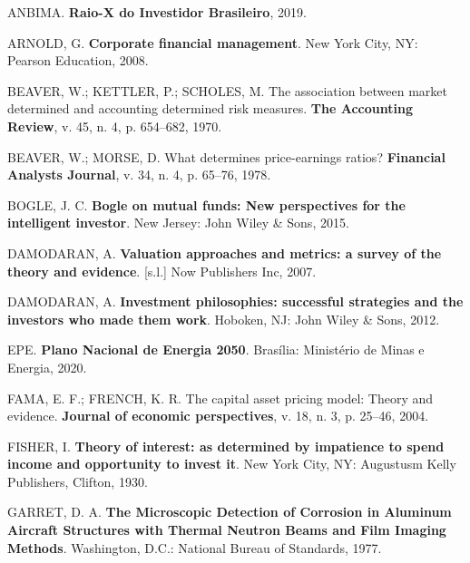 \documentclass[grad,numbers]{coppe}
\newenvironment{cslreferences}%
  {}%
  {\par}
\begin{document}

  \label{bib:begin}
  \noindent

  \setlength{\parindent}{-0.20in}
  \setlength{\leftskip}{0.20in}
  \setlength{\parskip}{8pt}

  \hypertarget{refs}{}
  \begin{cslreferences}
  \leavevmode\hypertarget{ref-anbima2019}{}%
  ANBIMA. \textbf{Raio-X do Investidor Brasileiro}, 2019.

  \leavevmode\hypertarget{ref-arnold2008}{}%
  ARNOLD, G. \textbf{Corporate financial management}. New York City, NY: Pearson Education, 2008.

  \leavevmode\hypertarget{ref-beaver1970}{}%
  BEAVER, W.; KETTLER, P.; SCHOLES, M. The association between market determined and accounting determined risk measures. \textbf{The Accounting Review}, v. 45, n. 4, p. 654--682, 1970.

  \leavevmode\hypertarget{ref-beaver1978}{}%
  BEAVER, W.; MORSE, D. What determines price-earnings ratios? \textbf{Financial Analysts Journal}, v. 34, n. 4, p. 65--76, 1978.

  \leavevmode\hypertarget{ref-bogle2015}{}%
  BOGLE, J. C. \textbf{Bogle on mutual funds: New perspectives for the intelligent investor}. New Jersey: John Wiley \& Sons, 2015.

  \leavevmode\hypertarget{ref-damodaran2007}{}%
  DAMODARAN, A. \textbf{Valuation approaches and metrics: a survey of the theory and evidence}. {[}s.l.{]} Now Publishers Inc, 2007.

  \leavevmode\hypertarget{ref-damodaran2012}{}%
  DAMODARAN, A. \textbf{Investment philosophies: successful strategies and the investors who made them work}. Hoboken, NJ: John Wiley \& Sons, 2012.

  \leavevmode\hypertarget{ref-epe2020}{}%
  EPE. \textbf{Plano Nacional de Energia 2050}. Brasília: Ministério de Minas e Energia, 2020.

  \leavevmode\hypertarget{ref-fama2004}{}%
  FAMA, E. F.; FRENCH, K. R. The capital asset pricing model: Theory and evidence. \textbf{Journal of economic perspectives}, v. 18, n. 3, p. 25--46, 2004.

  \leavevmode\hypertarget{ref-fisher1930}{}%
  FISHER, I. \textbf{Theory of interest: as determined by impatience to spend income and opportunity to invest it}. New York City, NY: Augustusm Kelly Publishers, Clifton, 1930.

  \leavevmode\hypertarget{ref-techreport-exampleIn}{}%
  GARRET, D. A. \textbf{The Microscopic Detection of Corrosion in Aluminum Aircraft Structures with Thermal Neutron Beams and Film Imaging Methods}. Washington, D.C.: National Bureau of Standards, 1977.


\end{cslreferences}
\end{document}
